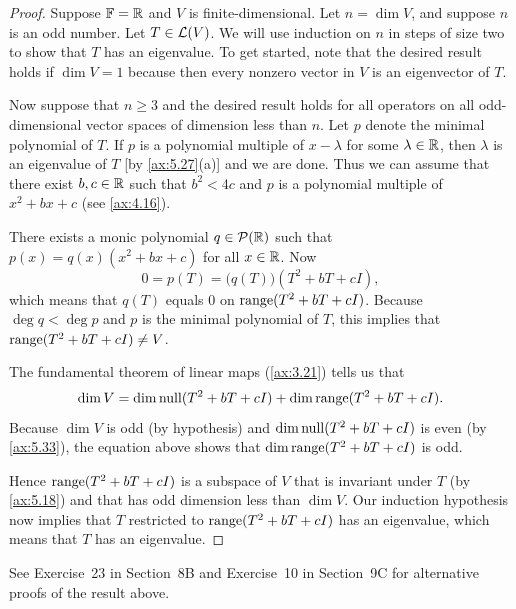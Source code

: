\begin{proof}
Suppose $\mathbb{F}=\mathbb{R}$ and $V$ is finite-dimensional. Let $n=\dim V$, and suppose
$n$ is an odd number. Let $T\in\mathcal{L}(V)$. We will use induction on $n$ in steps
of size two to show that $T$ has an eigenvalue. To get started, note that the
desired result holds if $\dim V=1$ because then every nonzero vector in $V$ is
an eigenvector of $T$.

Now suppose that $n\ge3$ and the desired result holds for all operators on all
odd-dimensional vector spaces of dimension less than $n$. Let $p$ denote the
minimal polynomial of $T$. If $p$ is a polynomial multiple of $x-\lambda$ for
some $\lambda\in\mathbb{R}$, then $\lambda$ is an eigenvalue of $T$ [by
\ref{ax:5.27}(a)] and we are done. Thus we can assume that there exist
$b,c\in\mathbb{R}$ such that $b^2<4c$ and $p$ is a polynomial multiple of $x^2+bx+c$
(see \ref{ax:4.16}).

There exists a monic polynomial $q\in\mathcal{P}(\mathbb{R})$ such that
$p(x)=q(x)(x^2+bx+c)$ for all $x\in\mathbb{R}$. Now
\[ 0=p(T)=\bigl(q(T)\bigr)(T^2+bT+cI), \]
which means that $q(T)$ equals $0$ on $\operatorname{range}(T^2+bT+cI)$. Because
$\deg q<\deg p$ and $p$ is the minimal polynomial of $T$, this implies that
$\operatorname{range}(T^2+bT+cI)\ne V$.

The fundamental theorem of linear maps (\ref{ax:3.21}) tells us that
\[ \operatorname{dim} V=\operatorname{dim}\operatorname{null}(T^2+bT+cI)+\operatorname{dim}\operatorname{range}(T^2+bT+cI). \]
Because $\dim V$ is odd (by hypothesis) and $\operatorname{dim}\operatorname{null}(T^2+bT+cI)$ is even (by
\ref{ax:5.33}), the equation above shows that $\operatorname{dim}\operatorname{range}(T^2+bT+cI)$ is odd.

Hence $\operatorname{range}(T^2+bT+cI)$ is a subspace of $V$ that is invariant under $T$
(by \ref{ax:5.18}) and that has odd dimension less than $\dim V$. Our
induction hypothesis now implies that $T$ restricted to $\operatorname{range}(T^2+bT+cI)$
has an eigenvalue, which means that $T$ has an eigenvalue.
\end{proof}

See Exercise~23 in Section~8B and Exercise~10 in Section~9C for alternative
proofs of the result above.


